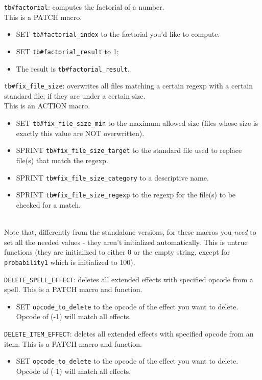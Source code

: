 \documentclass{article}
\begin{document}
\verb+tb#factorial+: computes the factorial of a number. \\
This is a PATCH macro.
\begin{itemize}
\item SET \verb+tb#factorial_index+ to the factorial you'd like to compute.
\item SET \verb+tb#factorial_result+ to 1;
\item The result is \verb+tb#factorial_result+.
\end{itemize}

\verb+tb#fix_file_size+: overwrites all files matching a certain regexp with a
certain standard file, if they are under a certain size. \\
This is an ACTION macro.
\begin{itemize}
\item SET \verb+tb#fix_file_size_min+ to the maximum allowed size
(files whose size is exactly this value are NOT overwritten).
\item SPRINT \verb+tb#fix_file_size_target+ to the standard file used to replace file(s) that match the regexp.
\item SPRINT \verb+tb#fix_file_size_category+ to a descriptive name.
\item SPRINT \verb+tb#fix_file_size_regexp+ to the regexp for the file(s) to be checked for a match.
\end{itemize}

\\

Note that, differently from the standalone versions, for these macros you \emph{need}
to set all the needed values - they aren't initialized automatically. This is untrue functions
(they are initialized to either 0 or the empty string, except for \verb+probability1+ which is initialized to 100).

\verb+DELETE_SPELL_EFFECT+: deletes all extended effects with specified opcode from a spell.
This is a PATCH macro and function.
\begin{itemize}
\item SET \verb+opcode_to_delete+ to the opcode of the effect you want to delete. Opcode of (-1) will match all effects.
\end{itemize}

\verb+DELETE_ITEM_EFFECT+: deletes all extended effects with specified opcode from an item.
This is a PATCH macro and function.
\begin{itemize}
\item SET \verb+opcode_to_delete+ to the opcode of the effect you want to delete. Opcode of (-1) will match all effects.
\end{itemize}
\end{document}
